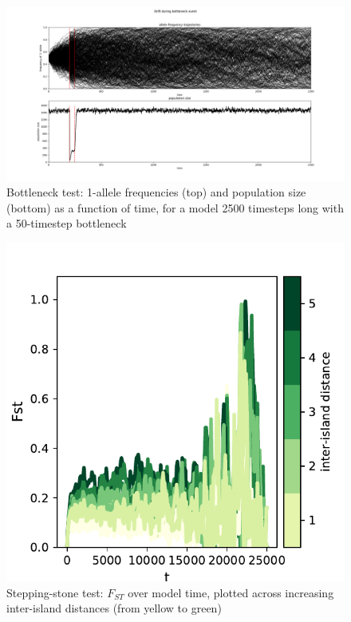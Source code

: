 ﻿\documentclass{article}
\begin{document}
\begin{figure}[!p]
\includegraphics[width=175mm]{./img/validation/bottleneck/alleles_seem_to_take_too_long_to_fix.png}
        \caption{Bottleneck test: 1-allele frequencies (top)
                 and population size (bottom) as a function of time,
                 for a model 2500 timesteps long with a 50-timestep bottleneck}
        \label{fig:bottleneck}
\end{figure}


\begin{figure}[!p]
        \includegraphics[width=175mm]{./img/final/STEPPING_STONE_Fst_over_time}
        \caption{Stepping-stone test: $F_{ST}$ over model time,
                 plotted across increasing inter-island distances
                 (from yellow to green)}
        \label{fig:stepstone_Fst_by_dist}
\end{figure}
\end{document}
